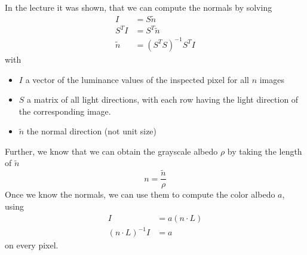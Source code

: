 \documentclass{paper}
\begin{document}
In the lecture it was shown, that we can compute the normals by solving
\begin{align*}
	 I &= S\tilde{n} \\
	 S^TI &= S^T\tilde{n} \\
	 \tilde{n} &= (S^TS)^{-1}S^TI
\end{align*}
with 
\begin{itemize}
	\item $I$ a vector of the luminance values of the 
	inspected pixel for all $n$ images
	\item $S$ a matrix of all light directions, with each row
	having the light direction of the corresponding image.
	\item $\tilde{n}$ the normal direction (not unit size)
\end{itemize}
Further, we know that we can obtain the grayscale albedo $\rho$ by taking the length of $\tilde{n}$
\begin{equation}
	n = \frac{\tilde{n}}{\rho}
\end{equation}
Once we know the normals, we can use them to compute the color albedo $a$, using
\begin{align*}
	I &= a(n \cdot L) \\
	(n \cdot L)^{-1} I &= a
\end{align*}
on every pixel.
\end{document}
